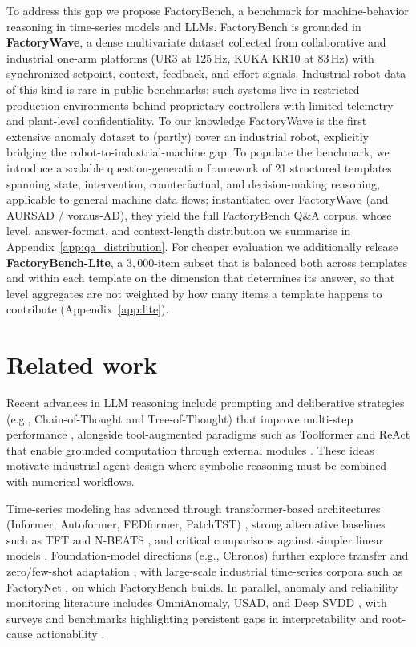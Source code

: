 To address this gap we propose FactoryBench, a benchmark for machine-behavior reasoning in time-series models and LLMs. FactoryBench is grounded in \textbf{FactoryWave}, a dense multivariate dataset collected from collaborative and industrial one-arm platforms (UR3 at 125\,Hz, KUKA KR10 at 83\,Hz) with synchronized setpoint, context, feedback, and effort signals. Industrial-robot data of this kind is rare in public benchmarks: such systems live in restricted production environments behind proprietary controllers with limited telemetry and plant-level confidentiality. To our knowledge FactoryWave is the first extensive anomaly dataset to (partly) cover an industrial robot, explicitly bridging the cobot-to-industrial-machine gap. To populate the benchmark, we introduce a scalable question-generation framework of 21 structured templates spanning state, intervention, counterfactual, and decision-making reasoning, applicable to general machine data flows; instantiated over FactoryWave (and AURSAD / voraus-AD), they yield the full FactoryBench Q\&A corpus, whose level, answer-format, and context-length distribution we summarise in Appendix~\ref{app:qa_distribution}. For cheaper evaluation we additionally release \textbf{FactoryBench-Lite}, a $3{,}000$-item subset that is balanced both across templates and within each template on the dimension that determines its answer, so that level aggregates are not weighted by how many items a template happens to contribute (Appendix~\ref{app:lite}).

\section{Related work}

Recent advances in LLM reasoning include prompting and deliberative strategies (e.g., Chain-of-Thought and Tree-of-Thought) that improve multi-step performance \cite{wei2022chain,yao2023tree}, alongside tool-augmented paradigms such as Toolformer and ReAct that enable grounded computation through external modules \cite{schick2023toolformer,yao2023react,qin2023tool}. These ideas motivate industrial agent design where symbolic reasoning must be combined with numerical workflows.

Time-series modeling has advanced through transformer-based architectures (Informer, Autoformer, FEDformer, PatchTST) \cite{zhou2021informer,wu2021autoformer,zhou2022fedformer,nie2022time}, strong alternative baselines such as TFT and N-BEATS \cite{lim2021tft,oreshkin2020nbeats}, and critical comparisons against simpler linear models \cite{zeng2023transformers}. Foundation-model directions (e.g., Chronos) further explore transfer and zero/few-shot adaptation \cite{ansari2024chronos,das2024decoder}, with large-scale industrial time-series corpora such as FactoryNet \cite{othman2026factorynetlargescaledatasetindustrial}, on which FactoryBench builds. In parallel, anomaly and reliability monitoring literature includes OmniAnomaly, USAD, and Deep SVDD \cite{su2019omni,audibert2020usad,ruff2018deep}, with surveys and benchmarks highlighting persistent gaps in interpretability and root-cause actionability \cite{chalapathy2019survey,lavin2015numenta}.

